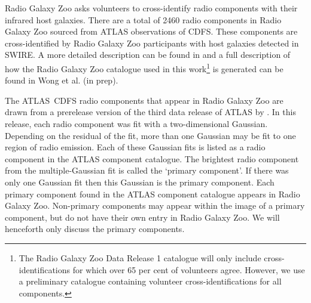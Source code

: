 \documentclass[11pt, a4paper]{book}
\begin{document}
    Radio Galaxy Zoo asks volunteers to cross-identify radio components with
    their infrared host galaxies. There are a total of 2460 radio components
    in Radio Galaxy Zoo sourced from ATLAS {observations of CDFS}. These components are
    cross-identified by Radio Galaxy Zoo participants with host galaxies
    detected in SWIRE. A more detailed description can be found in
    \citet{banfield15} and a full description of how the Radio Galaxy Zoo catalogue used in this work\footnote{The Radio Galaxy Zoo Data
    Release 1 catalogue will only include cross-identifications for which over
    65 per cent of volunteers agree. However, we use a preliminary catalogue containing volunteer
    cross-identifications for all components.} is generated can be found in Wong
    et al. (in prep).

    The ATLAS~CDFS radio components that appear in Radio Galaxy Zoo {are drawn from a prerelease version of} the third data release
    of ATLAS by \citet{franzen15}. In this release, each radio component was fit with a
    two-dimensional Gaussian. Depending on the residual of the fit, more than
    one Gaussian may be fit to one region of radio emission. Each of these
    Gaussian fits is listed as a radio component in the ATLAS component catalogue. The
    brightest radio component from the multiple-Gaussian fit is called the
    `primary component'. {If there was only one Gaussian fit then this Gaussian is the primary component}. Each primary component found in the ATLAS
    component catalogue appears in Radio Galaxy Zoo. Non-primary components
    may appear within the image of a primary component, but do not have their
    own entry in Radio Galaxy Zoo. We will henceforth only discuss the primary
    components.
\end{document}
